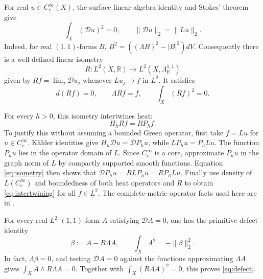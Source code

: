 \documentclass[11pt]{article}
\theoremstyle{remark}
\newcommand{\D}{\mathcal D}
\begin{document}
For real $u\in C_c^\infty(X)$, the surface linear-algebra identity
and Stokes' theorem give
\begin{equation}\label{eq:isometry}
 \int_X(\D u)^2=0,
 \qquad \|\D u\|_2=\|Lu\|_2.
\end{equation}
Indeed, for real $(1,1)$-forms $B$,
$B^2=((\Lambda B)^2-|B|^2)dV$.
Consequently there is a well-defined linear isometry
\[
 R:L^2(X,\mathbb R)\longrightarrow
                   L^2(X,\Lambda^{1,1}_{\mathbb R})
\]
given by $Rf=\lim_j\D u_j$ whenever $Lu_j\to f$ in $L^2$.
It satisfies
\[
 d(Rf)=0,\qquad \Lambda Rf=f,
 \qquad \int_X(Rf)^2=0.
\]

For every $h>0$, this isometry intertwines heat:
\begin{equation}\label{eq:intertwining}
 H_h Rf=R P_h f.
\end{equation}
To justify this without assuming a bounded Green operator, first
take $f=Lu$ for $u\in C_c^\infty$. K\"ahler identities give
$H_h\D u=\D P_hu$, while $LP_hu=P_hLu$.
The function $P_hu$ lies in the operator domain of $L$.
Since $C_c^\infty$ is a core, approximate $P_hu$ in the graph norm
of $L$ by compactly supported smooth functions. Equation
\eqref{eq:isometry} then shows that
$\D P_hu=RLP_hu=RP_hLu$. Finally use density of $L(C_c^\infty)$
and boundedness of both heat operators and $R$ to obtain
\eqref{eq:intertwining} for all $f\in L^2$.
The complete-metric operator facts used here are in
\cite[\S12]{DemaillyHodge}.

For every real $L^2$ $(1,1)$-form $A$ satisfying $\D A=0$, one has
the primitive-defect identity
\begin{equation}\label{eq:defect}
 \beta:=A-R\Lambda A,
 \qquad
 \int_X A^2=-\|\beta\|_2^2.
\end{equation}
In fact, $\Lambda\beta=0$, and testing $\D A=0$ against the
functions approximating $\Lambda A$ gives
$\int_XA\wedge R\Lambda A=0$. Together with
$\int_X(R\Lambda A)^2=0$, this proves \eqref{eq:defect}.
\end{document}
